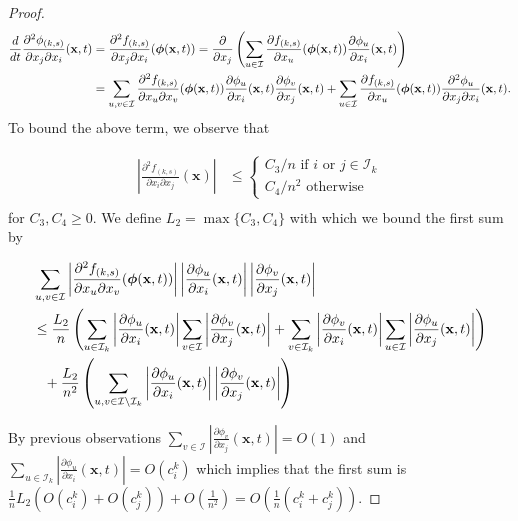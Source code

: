 \documentclass[acmsmall]{acmart}
\newcommand\bx{\mathbf{x}}
\newcommand\bphi{\text{\boldmath$\phi$}}
\newcommand\calI{\mathcal{I}}
\newcommand\abs[1]{\left|#1\right|}         %
\newcommand{\dd}[3]{ \frac{\partial^2 #1 }{ \partial x_{#2} \partial x_{#3}}}
\begin{document}
\begin{proof}
\begin{align}
   \frac{d}{dt} \frac{\partial^2 \phi_{(k,s)}}{\partial x_j\partial x_i}(\bx, t) &= \frac{\partial^2 f_{(k,s)}}{\partial x_j \partial x_i}(\bphi (\bx,t)) 
  = \frac{\partial}{\partial x_j} \left( \sum_{u \in \calI} \frac{\partial f_{(k,s)}}{\partial x_u}(\bphi (\bx,t)) \frac{\partial \phi_{u}}{\partial x_i}(\bx,t) \right)\label{eq:second_derivative_phi} \\
  & = \sum_{u,v \in \calI} \dd{f_{(k,s)}}{u}{v}(\bphi (\bx,t)) \frac{\partial \phi_{u}}{\partial x_i}(\bx,t) \frac{\partial \phi_{v}}{\partial x_j}(\bx,t) + \sum_{u \in \calI} \frac{\partial f_{(k,s)}}{\partial x_u}(\bphi (\bx,t)) \dd{\phi_u}{j}{i}(\bx,t).
  \nonumber
\end{align}
\color{myorange}
To bound the above term, we observe that 

\begin{align*}
\abs{\dd{f_{(k,s)}}{i}{j}(\bx)} & \leq 
\begin{cases}
C_3/n \text{ if } i \text{ or } j \in \calI_k \\
C_4/n^2 \text{ otherwise} 
\end{cases} \\
\end{align*}
for $C_3, C_4 \geq 0$. We define $L_2 = \max\{C_3,C_4\}$ with which we bound the first sum by



\begin{align*}
  & \sum_{u,v \in \calI} \abs{\dd{f_{(k,s)}}{u}{v}(\bphi (\bx,t))} \abs{\frac{\partial \phi_{u}}{\partial x_i}(\bx,t)} \abs{\frac{\partial \phi_{v}}{\partial x_j}(\bx,t)} \\
  & \leq \frac{L_{2}}{n}\left( \sum_{ u \in \calI_k} \abs{\frac{\partial \phi_{u}}{\partial x_i}(\bx,t)} \sum_{v \in \calI }\abs{\frac{\partial \phi_{v}}{\partial x_j}(\bx,t)} + \sum_{ v \in \calI_k} \abs{\frac{\partial \phi_{v}}{\partial x_i}(\bx,t)} \sum_{u \in \calI }\abs{\frac{\partial \phi_{u}}{\partial x_j}(\bx,t)}\right) \\
  & \phantom{=}+ \frac{L_2}{n^2}\left( \sum_{u,v \in \calI \setminus \calI_k} \abs{\frac{\partial \phi_{u}}{\partial x_i}(\bx,t)} \abs{\frac{\partial \phi_{v}}{\partial x_j}(\bx,t)} \right)
\end{align*}

By previous observations $\sum_{v \in \calI }\abs{\frac{\partial \phi_{v}}{\partial x_j}(\bx, t)} = O(1)$ and $\sum_{ u \in \calI_k} \abs{\frac{\partial \phi_{u}}{\partial x_i}(\bx,t)} = O(c^k_i)$ which implies that the first sum is $\frac{1}{n}L_{2}(O(c^k_i)+O(c^k_j)) + O(\frac{1}{n^2}) = O(\frac{1}{n}(c^k_i + c^k_j))$. 
\color{black}



\end{proof}
\end{document}
